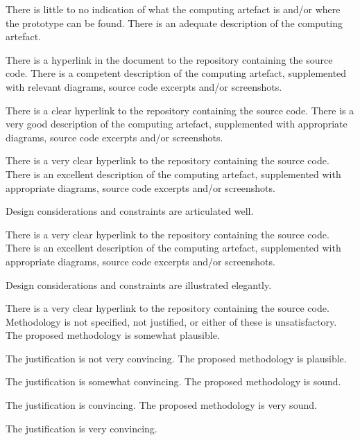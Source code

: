 \begin{markingrubric}
        \grade\fail 	There is little to no indication of what the computing artefact is and/or where the prototype can be found.
        \grade 		There is an adequate description of the computing artefact. 
        \par		There is a hyperlink in the document to the repository containing the source code.
        \grade 		There is a competent description of the computing artefact, supplemented with relevant diagrams, source code excerpts and/or screenshots.
        \par		There is a clear hyperlink to the repository containing the source code.
        \grade 		There is a very good description of the computing artefact, supplemented with appropriate diagrams, source code excerpts and/or screenshots.
        \par		There is a very clear hyperlink to the repository containing the source code.
        \grade 		There is an excellent description of the computing artefact, supplemented with appropriate diagrams, source code excerpts and/or screenshots. 
        \par		Design considerations and constraints are articulated well. 
        \par 		There is a very clear hyperlink to the repository containing the source code.
        \grade 		There is an excellent description of the computing artefact, supplemented with appropriate diagrams, source code excerpts and/or screenshots.
        \par		Design considerations and constraints are illustrated elegantly. 
        \par 		There is a very clear hyperlink to the repository containing the source code.
        \grade\fail 	Methodology is not specified, not justified, or either of these is unsatisfactory.
        \grade 		The proposed methodology is somewhat plausible.
        \par		The justification is not very convincing.
        \grade 		The proposed methodology is plausible.
        \par		The justification is somewhat convincing.
        \grade 		The proposed methodology is sound.
        \par		The justification is convincing.
        \grade 		The proposed methodology is very sound.
        \par		The justification is very convincing.

\end{markingrubric}
